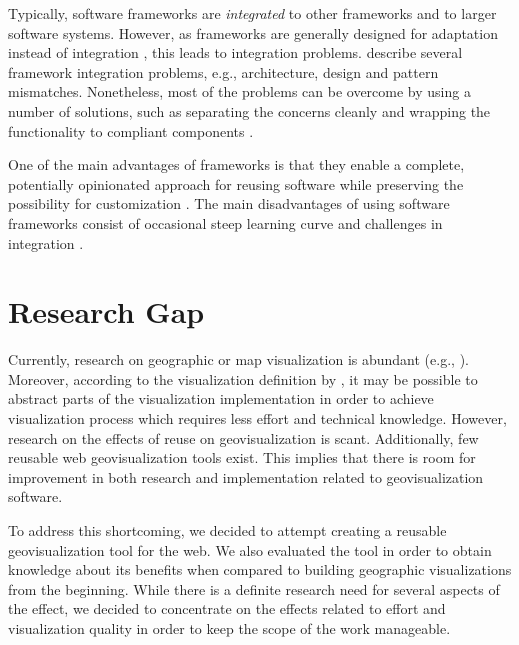 Typically, software frameworks are \emph{integrated} to other frameworks and to larger software systems. However, as frameworks are generally designed for adaptation instead of integration \citep{mattsson_framework_1999}, this leads to integration problems. \citet{mattsson_framework_1999} describe several framework integration problems, e.g., architecture, design and pattern mismatches. Nonetheless, most of the problems can be overcome by using a number of solutions, such as separating the concerns cleanly and wrapping the functionality to compliant components \citep{mattsson_framework_1999}.

One of the main advantages of frameworks is that they enable a complete, potentially opinionated approach for reusing software while preserving the possibility for customization \citep{johnson_frameworkscomponents+_1997}. The main disadvantages of using software frameworks consist of occasional steep learning curve and challenges in integration \citep{fayad_object-oriented_1997}.

\chapter{Research Gap}
\label{chapter:researchgap}

Currently, research on geographic or map visualization is abundant (e.g., \citealt{kraak_cartographic_1998,kraak_cartography_2011,slocum_thematic_2014,schlichtmann_visualization_2002,zuk_heuristics_2006}). Moreover, according to the visualization definition by \citet{kosara_visualization_2007}, it may be possible to abstract parts of the visualization implementation in order to achieve visualization process which requires less effort and technical knowledge. However, research on the effects of reuse on geovisualization is scant. Additionally, few reusable web geovisualization tools exist. This implies that there is room for improvement in both research and implementation related to geovisualization software.

To address this shortcoming, we decided to attempt creating a reusable geovisualization tool for the web. We also evaluated the tool in order to obtain knowledge about its benefits when compared to building geographic visualizations from the beginning. While there is a definite research need for several aspects of the effect, we decided to concentrate on the effects related to effort and visualization quality in order to keep the scope of the work manageable.


